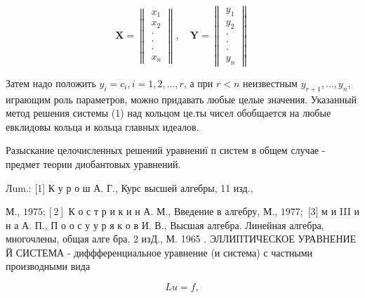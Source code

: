\documentclass[10pt]{article}
\begin{document}
\[

\boldsymbol{X}=\left\|\begin{array}{c}

x_{1} \\

x_{2} \\

\cdot \\

\cdot \\

\cdot \\

x_{n}

\end{array}\right\|, \quad \boldsymbol{Y}=\left\|\begin{array}{c}

y_{1} \\

y_{2} \\

\cdot \\

\cdot \\

\cdot \\

y_{n}

\end{array}\right\|

\]



Затем надо положить $y_{i}=c_{i}, i=1,2, \ldots, r$, а при $r<n$ неизвестным $y_{r+1}, \ldots, y_{n}$, играющим роль параметров, можно придавать любые целые значения. Указанный метод решения системы (1) над кольцом це.ты чисел обобщается на любые евклидовы кольца и кольца главных идеалов.



Разыскание целочисленных решений уравнениї п систем в общем случае - предмет теории диобантовых уравнений.



Лum.: [1] К у р о ш А. Г., Курс высшей алгебры, 11 изд.,

М., $1975 ;[2]$ К о с т р и к и н А. М., Введение в алгебру, М., $1977 ;$ [3] м и III и н а А. П., П о о с у у р я к о в И. В., Высшая алгебра. Линейная алгебра, многочлены, общая алге бра, 2 изД., М. 1965 . ЭЛЛИПТИЧЕСКОЕ УРАВНЕНИЕ Й СИСТЕМА - диффференциальное уравнение (и система) с частными производными вида



\[

L u=f,

\]
\end{document}
